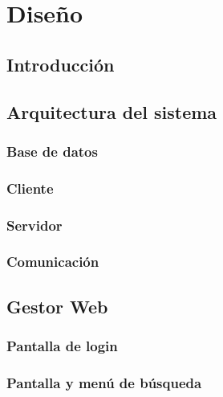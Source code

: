 \section{Diseño}

\subsection{Introducción}
 
\subsection{Arquitectura del sistema}
	\subsubsection{Base de datos}
	\subsubsection{Cliente}
	\subsubsection{Servidor}
	\subsubsection{Comunicación}

\subsection{Gestor Web}
	\subsubsection{Pantalla de login}
	\subsubsection{Pantalla y menú de búsqueda}
	
\newpage


